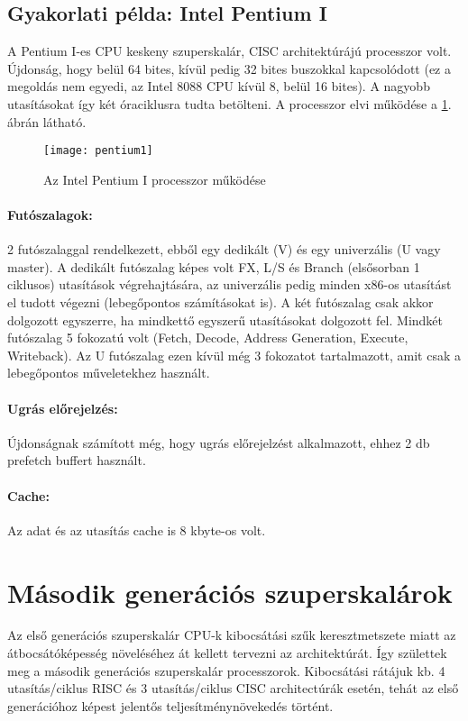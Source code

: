 \subsection{Gyakorlati példa: Intel Pentium I}
A Pentium I-es CPU keskeny szuperskalár, CISC architektúrájú processzor volt.
Újdonság, hogy belül 64 bites, kívül pedig 32 bites buszokkal kapcsolódott (ez a megoldás nem egyedi, az Intel 8088 CPU kívül 8, belül 16 bites).
A nagyobb utasításokat így két óraciklusra tudta betölteni.
A processzor elvi működése a \ref{fig:pentium1}. ábrán látható.
\begin{figure}[h]
    \texttt{[image: pentium1]}
    \centering
    \caption{Az Intel Pentium I processzor működése}
    \label{fig:pentium1}
\end{figure}
\paragraph{Futószalagok:}
2 futószalaggal rendelkezett, ebből egy dedikált (V) és egy univerzális (U vagy master).
A dedikált futószalag képes volt FX, L/S és Branch (elsősorban 1 ciklusos) utasítások végrehajtására, az univerzális pedig minden x86-os utasítást el tudott végezni (lebegőpontos számításokat is).
A két futószalag csak akkor dolgozott egyszerre, ha mindkettő egyszerű utasításokat dolgozott fel.
Mindkét futószalag 5 fokozatú volt (Fetch, Decode, Address Generation, Execute, Writeback).
Az U futószalag ezen kívül még 3 fokozatot tartalmazott, amit csak a lebegőpontos műveletekhez használt.
\paragraph{Ugrás előrejelzés:}
Újdonságnak számított még, hogy ugrás előrejelzést alkalmazott, ehhez 2 db prefetch buffert használt.
\paragraph{Cache:}
Az adat és az utasítás cache is 8 kbyte-os volt.

\section{Második generációs szuperskalárok}
Az első generációs szuperskalár CPU-k kibocsátási szűk keresztmetszete miatt az átbocsátóképesség növeléséhez át kellett tervezni az architektúrát.
Így születtek meg a második generációs szuperskalár processzorok.
Kibocsátási rátájuk kb. 4 utasítás/ciklus RISC és 3 utasítás/ciklus CISC architectúrák esetén, tehát az első generációhoz képest jelentős teljesítménynövekedés történt.

